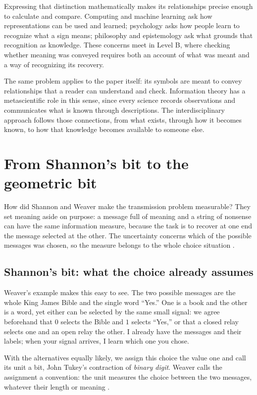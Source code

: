 \documentclass[11pt,a4paper]{article}
\theoremstyle{definition}
\begin{document}
Expressing that distinction mathematically makes its relationships
precise enough to calculate and compare. Computing and machine learning
ask how representations can be used and learned; psychology asks how
people learn to recognize what a sign means; philosophy and epistemology
ask what grounds that recognition as knowledge. These concerns meet in
Level B, where checking whether meaning was conveyed requires both an
account of what was meant and a way of recognizing its recovery.

The same problem applies to the paper itself: its symbols are meant to
convey relationships that a reader can understand and check. Information
theory has a metascientific role in this sense, since every science
records observations and communicates what is known through descriptions.
The interdisciplinary approach follows those connections, from what
exists, through how it becomes known, to how that knowledge becomes
available to someone else.

\section{From Shannon's bit to the geometric bit}
\label{sec:v1-comparison}

How did Shannon and Weaver make the transmission problem measurable?
They set meaning aside on purpose: a message full of meaning and a
string of nonsense can have the same information measure, because
the task is to recover at one end the message selected at the other.
The uncertainty concerns which of the possible messages was chosen,
so the measure belongs to the whole choice situation
\citep[pp.~8--9]{ShannonWeaver1949}.

\subsection{Shannon's bit: what the choice already assumes}

Weaver's example makes this easy to see. The two possible messages
are the whole King James Bible and the single word ``Yes.'' One is
a book and the other is a word, yet either can be selected by the
same small signal: we agree beforehand that $0$ selects the Bible
and $1$ selects ``Yes,'' or that a closed relay selects one and an
open relay the other. I already have the messages and their labels;
when your signal arrives, I learn which one you chose.

With the alternatives equally likely, we assign this choice the
value one and call its unit a bit, John Tukey's contraction of
\emph{binary digit}. Weaver calls the assignment a convention:
the unit measures the choice between the two messages, whatever
their length or meaning \citep[p.~9]{ShannonWeaver1949}.
\end{document}
